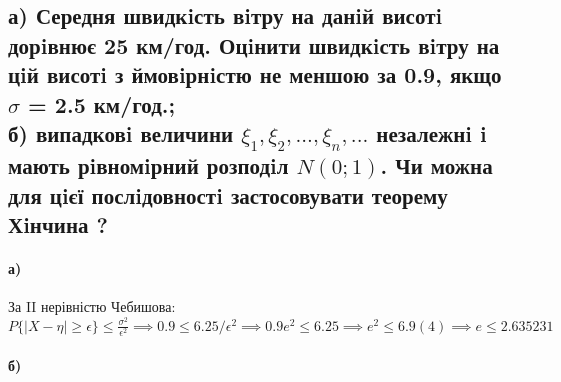 \documentclass[a4paper, 12pt, oneside]{extarticle}
\newcommand{\Problem}{\subsection}
\begin{document}


\setcounter{subsection}{2}

\Problem{
	а) Середня швидкiсть вiтру на данiй висотi дорiвнює 25 км/год. Оцiнити швидкiсть вiтру на
цiй висотi з ймовiрнiстю не меншою за 0.9, якщо $\sigma$ = 2.5 км/год.;
\\
	б) випадковi величини $\xi_1, \xi_2, ... , \xi_n, ...$ незалежнi i мають рiвномiрний розподiл $N(0; 1)$. Чи можна для цiєї послiдовностi застосовувати теорему Хiнчина ?
}

\paragraph{а)} За II нерівністю Чебишова:
$
{\displaystyle P\{|X-\eta |\geq \epsilon \}\leq {\frac {{\sigma }^{2}}{{\epsilon }^{2}}}}
\implies
0.9 \leq 6.25/\epsilon^2
\implies
0.9e^2 \leq 6.25
\implies
e^2 \leq 6.9(4)
\implies
e \leq 2.635231%
$



\paragraph{б)}
\end{document}
